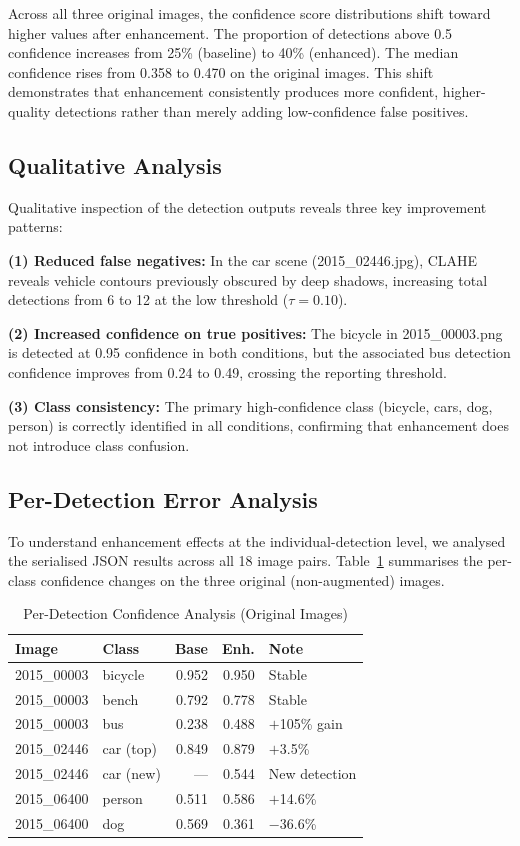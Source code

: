 \documentclass[conference]{IEEEtran}
\begin{document}
Across all three original images, the confidence score distributions
shift toward higher values after enhancement. The proportion of detections
above 0.5 confidence increases from 25\% (baseline) to 40\% (enhanced).
The median confidence rises from 0.358 to 0.470 on the original images.
This shift demonstrates that enhancement consistently produces more
confident, higher-quality detections rather than merely adding
low-confidence false positives.

\subsection{Qualitative Analysis}

Qualitative inspection of the detection outputs reveals three key
improvement patterns:

\textbf{(1) Reduced false negatives:} In the car scene
(2015\_02446.jpg), CLAHE reveals vehicle contours previously obscured by
deep shadows, increasing total detections from 6 to 12 at the low
threshold ($\tau = 0.10$).

\textbf{(2) Increased confidence on true positives:} The bicycle in
2015\_00003.png is detected at 0.95 confidence in both conditions, but
the associated bus detection confidence improves from 0.24 to 0.49,
crossing the reporting threshold.

\textbf{(3) Class consistency:} The primary high-confidence class
(bicycle, cars, dog, person) is correctly identified in all conditions,
confirming that enhancement does not introduce class confusion.

\subsection{Per-Detection Error Analysis}

To understand enhancement effects at the individual-detection level,
we analysed the serialised JSON results across all 18 image pairs.
Table~\ref{tab:perdet} summarises the per-class confidence changes on
the three original (non-augmented) images.

\begin{table}[h]
\centering
\caption{Per-Detection Confidence Analysis (Original Images)}
\label{tab:perdet}
\begin{tabular}{llrrl}
\toprule
\textbf{Image} & \textbf{Class} & \textbf{Base} & \textbf{Enh.} & \textbf{Note} \\
\midrule
2015\_00003 & bicycle & 0.952 & 0.950 & Stable \\
2015\_00003 & bench   & 0.792 & 0.778 & Stable \\
2015\_00003 & bus     & 0.238 & 0.488 & $+$105\% gain \\
\midrule
2015\_02446 & car (top) & 0.849 & 0.879 & $+$3.5\% \\
2015\_02446 & car (new) & --- & 0.544 & New detection \\
\midrule
2015\_06400 & person  & 0.511 & 0.586 & $+$14.6\% \\
2015\_06400 & dog     & 0.569 & 0.361 & $-$36.6\% \\
\bottomrule
\end{tabular}
\end{table}
\end{document}
